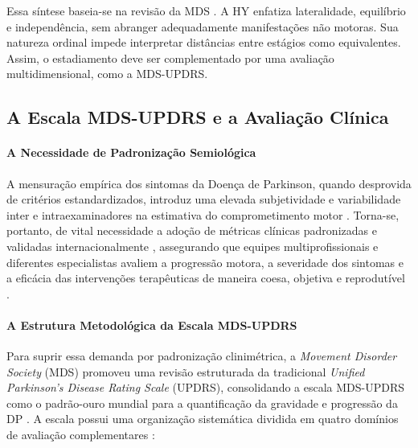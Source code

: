 Essa síntese baseia-se na revisão da MDS \cite{Goetz2004HY}. A HY enfatiza lateralidade, equilíbrio e independência, sem abranger adequadamente manifestações não motoras. Sua natureza ordinal impede interpretar distâncias entre estágios como equivalentes. Assim, o estadiamento deve ser complementado por uma avaliação multidimensional, como a MDS-UPDRS.

\subsection{A Escala MDS-UPDRS e a Avaliação Clínica} 
\label{subsec:mds-updrs}

\paragraph{A Necessidade de Padronização Semiológica} 
A mensuração empírica dos sintomas da Doença de Parkinson, quando desprovida de critérios estandardizados, introduz uma elevada subjetividade e variabilidade inter e intraexaminadores na estimativa do comprometimento motor \cite{Luiz2022}. Torna-se, portanto, de vital necessidade a adoção de métricas clínicas padronizadas e validadas internacionalmente \cite{Goetz2008}, assegurando que equipes multiprofissionais e diferentes especialistas avaliem a progressão motora, a severidade dos sintomas e a eficácia das intervenções terapêuticas de maneira coesa, objetiva e reprodutível \cite{Santos2024, Luiz2022}. 

\paragraph{A Estrutura Metodológica da Escala MDS-UPDRS} 
Para suprir essa demanda por padronização clinimétrica, a \textit{Movement Disorder Society} (MDS) promoveu uma revisão estruturada da tradicional \textit{Unified Parkinson's Disease Rating Scale} (UPDRS), consolidando a escala MDS-UPDRS como o padrão-ouro mundial para a quantificação da gravidade e progressão da DP \cite{Goetz2008, Luiz2022}. A escala possui uma organização sistemática dividida em quatro domínios de avaliação complementares \cite{Santos2024, Goetz2008}: 

